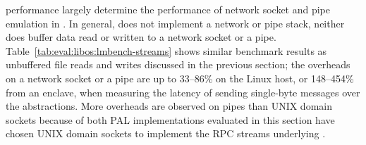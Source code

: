 \label{sec:eval:libos:streams}


\begin{table}[t!b!]

\caption{Network socket and pipe performance based on \lmbench{}. Comparison is among (1) native Linux processes; (2) \graphene{} on Linux host, both without and with \seccomp{} filter ({\bf +SC}) and reference monitor ({\bf +RM}); (3) \graphenesgx{}.
System call latency is in microseconds, and lower is better.
System call bandwidth is in megabytes per second, and higher is better. 
Overheads are relative to Linux; negative overheads indicate improvement.} 
\label{tab:eval:libos:lmbench-streams}
\end{table}


\Thehostabi{} performance
largely determine
the performance of network socket and pipe emulation
in \thelibos{}.
In general, \thelibos{} does not implement a network or pipe stack,
neither does \thelibos{}
buffer data read or written to a network socket or a pipe.
Table~\ref{tab:eval:libos:lmbench-streams} shows similar benchmark results as
unbuffered file reads and writes discussed in the previous section;
the overheads on a network socket or a pipe are up to 33--86\% on the Linux host,
or 148--454\% from an enclave,
when measuring the latency of sending single-byte messages
over the abstractions.
More overheads
are observed on pipes than UNIX domain sockets because of both PAL implementations
evaluated in this section have chosen
UNIX domain sockets
to implement the RPC streams underlying \thelibos{}.
 
